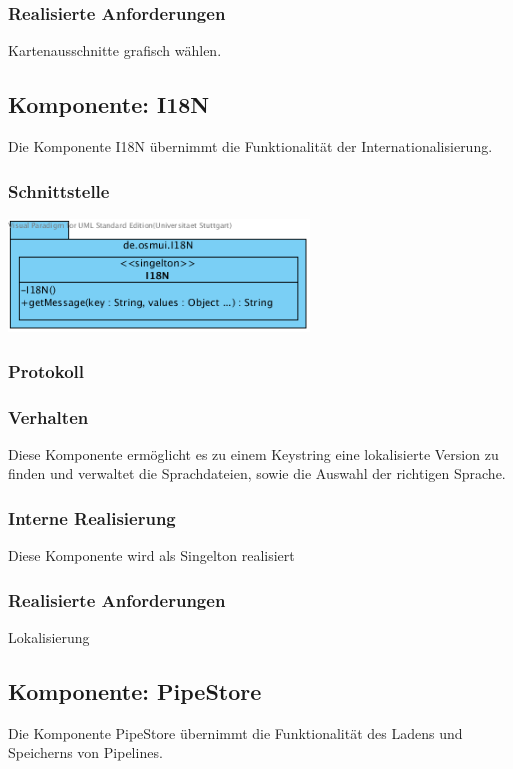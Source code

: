 \documentclass[a4paper,12pt]{scrartcl}
\begin{document}
\subsubsection{Realisierte Anforderungen}
Kartenausschnitte grafisch wählen.

\subsection{Komponente: I18N}
Die Komponente I18N übernimmt die Funktionalität der Internationalisierung.
\subsubsection{Schnittstelle}
\begin{center}
\includegraphics[width=8cm]{Schnittstelle_I18N.png}
\end{center}
\subsubsection{Protokoll}
\subsubsection{Verhalten}
Diese Komponente ermöglicht es zu einem Keystring eine lokalisierte Version zu finden und verwaltet die Sprachdateien, sowie die Auswahl der richtigen Sprache.
\subsubsection{Interne Realisierung}
Diese Komponente wird als Singelton realisiert
\subsubsection{Realisierte Anforderungen}
Lokalisierung

\subsection{Komponente: PipeStore}
Die Komponente PipeStore übernimmt die Funktionalität des Ladens und Speicherns von Pipelines.
\end{document}
